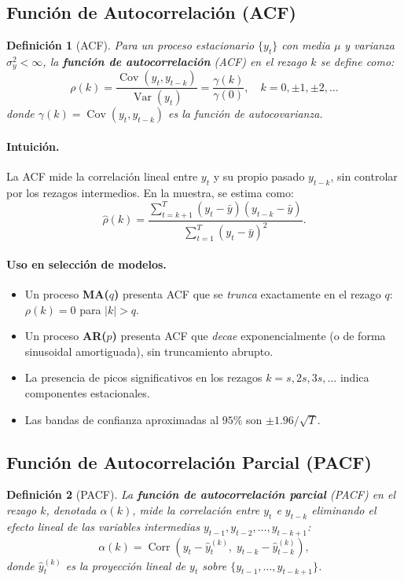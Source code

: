 \documentclass[12pt,a4paper]{article}
\newtheorem{definicion}{Definición}[section]
\DeclareMathOperator{\Cov}{Cov}
\DeclareMathOperator{\Var}{Var}
\DeclareMathOperator{\Corr}{Corr}
\begin{document}
\subsection{Función de Autocorrelación (ACF)}

\begin{definicion}[ACF]
Para un proceso estacionario $\{y_t\}$ con media $\mu$ y varianza $\sigma_y^2 < \infty$,
la \textbf{función de autocorrelación} (ACF) en el rezago $k$ se define como:
\[
  \rho(k) = \frac{\Cov(y_t, y_{t-k})}{\Var(y_t)}
           = \frac{\gamma(k)}{\gamma(0)}, \quad k = 0, \pm 1, \pm 2, \ldots
\]
donde $\gamma(k) = \Cov(y_t, y_{t-k})$ es la función de autocovarianza.
\end{definicion}

\paragraph{Intuición.}
La ACF mide la correlación lineal entre $y_t$ y su propio pasado $y_{t-k}$, sin controlar
por los rezagos intermedios. En la muestra, se estima como:
\[
  \hat{\rho}(k) = \frac{\displaystyle\sum_{t=k+1}^{T}(y_t - \bar{y})(y_{t-k} - \bar{y})}
                       {\displaystyle\sum_{t=1}^{T}(y_t - \bar{y})^2}.
\]

\paragraph{Uso en selección de modelos.}
\begin{itemize}
  \item Un proceso \textbf{MA($q$)} presenta ACF que se \textit{trunca} exactamente en el rezago $q$:
        $\rho(k) = 0$ para $|k| > q$.
  \item Un proceso \textbf{AR($p$)} presenta ACF que \textit{decae} exponencialmente (o de forma
        sinusoidal amortiguada), sin truncamiento abrupto.
  \item La presencia de picos significativos en los rezagos $k = s, 2s, 3s, \ldots$ indica
        componentes estacionales.
  \item Las bandas de confianza aproximadas al $95\%$ son $\pm 1.96 / \sqrt{T}$.
\end{itemize}

\subsection{Función de Autocorrelación Parcial (PACF)}

\begin{definicion}[PACF]
La \textbf{función de autocorrelación parcial} (PACF) en el rezago $k$, denotada $\alpha(k)$,
mide la correlación entre $y_t$ e $y_{t-k}$ \emph{eliminando} el efecto lineal de las variables
intermedias $y_{t-1}, y_{t-2}, \ldots, y_{t-k+1}$:
\[
  \alpha(k) = \Corr(y_t - \hat{y}_t^{(k)},\; y_{t-k} - \hat{y}_{t-k}^{(k)}),
\]
donde $\hat{y}_t^{(k)}$ es la proyección lineal de $y_t$ sobre $\{y_{t-1}, \ldots, y_{t-k+1}\}$.
\end{definicion}
\end{document}
